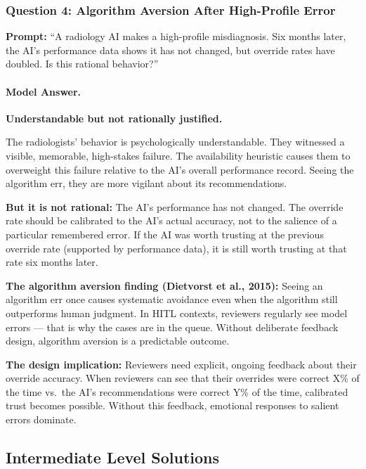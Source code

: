 \subsubsection{Question 4: Algorithm Aversion After High-Profile Error}

\textbf{Prompt:} ``A radiology AI makes a high-profile misdiagnosis. Six months later, the AI's performance data shows it has not changed, but override rates have doubled. Is this rational behavior?''

\paragraph{Model Answer.}

\textbf{Understandable but not rationally justified.}

The radiologists' behavior is psychologically understandable. They witnessed a visible, memorable, high-stakes failure. The availability heuristic causes them to overweight this failure relative to the AI's overall performance record. Seeing the algorithm err, they are more vigilant about its recommendations.

\textbf{But it is not rational:} The AI's performance has not changed. The override rate should be calibrated to the AI's actual accuracy, not to the salience of a particular remembered error. If the AI was worth trusting at the previous override rate (supported by performance data), it is still worth trusting at that rate six months later.

\textbf{The algorithm aversion finding (Dietvorst et al., 2015):} Seeing an algorithm err once causes systematic avoidance even when the algorithm still outperforms human judgment. In HITL contexts, reviewers regularly see model errors --- that is why the cases are in the queue. Without deliberate feedback design, algorithm aversion is a predictable outcome.

\textbf{The design implication:} Reviewers need explicit, ongoing feedback about their override accuracy. When reviewers can see that their overrides were correct X\% of the time vs.\ the AI's recommendations were correct Y\% of the time, calibrated trust becomes possible. Without this feedback, emotional responses to salient errors dominate.

\subsection{Intermediate Level Solutions}

